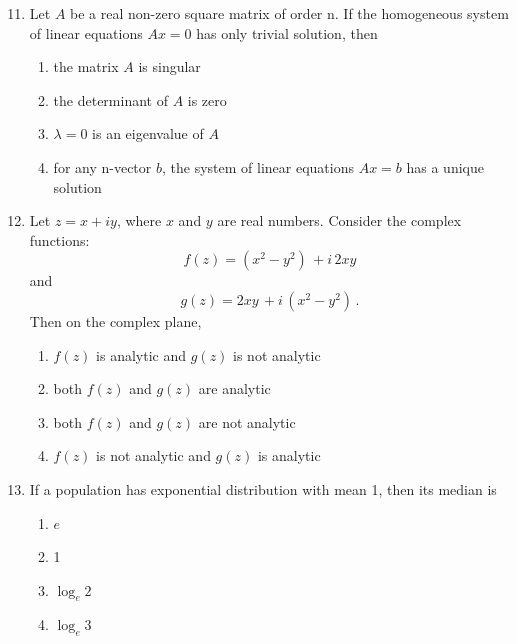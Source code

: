 \documentclass[journal]{IEEEtran}
\theoremstyle{remark}
\begin{document}
\begin{enumerate}[itemsep=1em]
\setcounter{enumi}{10}
\item Let $A$ be a real non-zero square matrix of order n. If the homogeneous system of linear equations $Ax=0$ has only trivial solution, then 
\begin{enumerate}[leftmargin=2.5em, labelsep=0.5em, itemsep=0.5em]
    \item the matrix $A$ is singular
    \item the determinant of $A$ is zero 
    \item $\lambda=0$ is an eigenvalue of $A$
    \item for any n-vector $b$, the system of linear equations $Ax=b$ has a unique solution
\end{enumerate}
\end{enumerate}

\begin{enumerate}[itemsep=1em]
\setcounter{enumi}{11}
\item Let $z=x+iy$, where $x$ and $y$ are real numbers. Consider the complex functions: 
\[
f(z)=(x^2-y^2)\,+i\,2xy
\]
and
\[
g(z)=2xy\,+i\,(x^2-y^2)\,.
\]
Then on the complex plane, 
\begin{enumerate}[leftmargin=2.5em, labelsep=0.5em, itemsep=0.5em]
    \item $f(z)$ is analytic and $g(z)$ is not analytic
    \item both $f(z)$ and $g(z)$ are analytic 
    \item both $f(z)$ and $g(z)$ are not analytic 
    \item $f(z)$ is not analytic and $g(z)$ is analytic 
\end{enumerate}
\end{enumerate}

\begin{enumerate}[itemsep=1em]
\setcounter{enumi}{12}
\item If a population has exponential distribution with mean 1, then its median is  
\begin{multicols}{4}
\begin{enumerate}
    \item $e$
    \item 1
    \item $\log_e2$
    \item $\log_e3$
\end{enumerate}
\end{multicols}
\end{enumerate}
\end{document}
